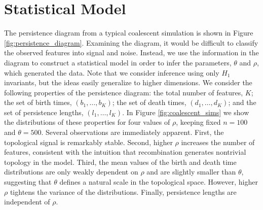 \section{Statistical Model}
\label{sec:model}

The persistence diagram from a typical coalescent simulation is shown in Figure \ref{fig:persistence_diagram}.
Examining the diagram, it would be difficult to classify the observed features into signal and noise.
Instead, we use the information in the diagram to construct a statistical model in order to infer the parameters, $\theta$ and $\rho$, which generated the data.
Note that we consider inference using only $H_1$ invariants, but the ideas easily generalize to higher dimensions.
We consider the following properties of the persistence diagram: the total number of features, $K$; the set of birth times, $(b_1,{\ldots},b_K)$; the set of death times, $(d_1,{\ldots},d_K)$; and the set of persistence lengths, $(l_1,{\ldots},l_K)$.
In Figure \ref{fig:coalescent_sims} we show the distributions of these properties for four values of $\rho$, keeping fixed $n=100$ and $\theta=500$.
Several observations are immediately apparent.
First, the topological signal is remarkably stable.
Second, higher $\rho$ increases the number of features, consistent with the intuition that recombination generates nontrivial topology in the model.
Third, the mean values of the birth and death time distributions are only weakly dependent on $\rho$ and are slightly smaller than $\theta$, suggesting that $\theta$ defines a natural scale in the topological space.
However, higher $\rho$ tightens the variance of the distributions.
Finally, persistence lengths are independent of $\rho$.

